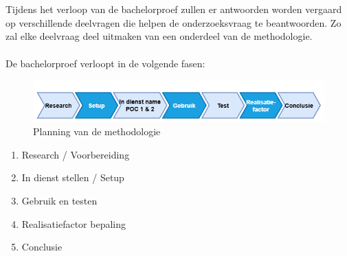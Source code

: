 
\chapter{}%
\label{ch:methodologie}

Tijdens het verloop van de bachelorproef zullen er antwoorden worden vergaard op verschillende deelvragen die helpen de onderzoeksvraag te beantwoorden. Zo zal elke deelvraag deel uitmaken van een onderdeel van de methodologie.
\\\\
De bachelorproef verloopt in de volgende fasen:

\begin{figure}[h]
  \includegraphics[width=\linewidth]{../graphics/Planning.png}
  \caption{Planning van de methodologie}
  \label{fig:Planning}
\end{figure}

\begin{enumerate}
  \item Research / Voorbereiding
  \item In dienst stellen / Setup
  \item Gebruik en testen
  \item Realisatiefactor bepaling
  \item Conclusie
\end{enumerate}

